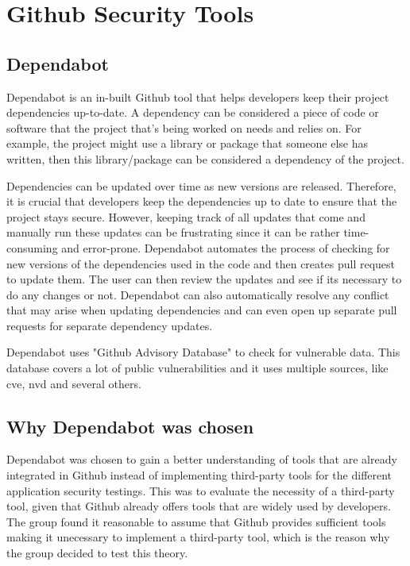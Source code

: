 \section{Github Security Tools}

\subsection{Dependabot}
Dependabot is an in-built Github tool that helps developers keep their project dependencies up-to-date. A dependency can be considered a piece of code or software that the project that's being worked on needs and relies on. For example, the project might use a library or package that someone else has written, then this library/package can be considered a dependency of the project. 

Dependencies can be updated over time as new versions are released. Therefore, it is crucial that developers keep the dependencies up to date to ensure that the project stays secure. However, keeping track of all updates that come and manually run these updates can be frustrating since it can be rather time-consuming and error-prone. Dependabot automates the process of checking for new versions of the dependencies used in the code and then creates pull request to update them. The user can then review the updates and see if its necessary to do any changes or not. 
Dependabot can also automatically resolve any conflict that may arise when updating dependencies and can even open up separate pull requests for separate dependency updates.  \cite{GithubDependabot2}

Dependabot uses "Github Advisory Database" to check for vulnerable data. This database covers a lot of public vulnerabilities and it uses multiple sources, like \acrlong{cve}, \acrlong{nvd} and several others. \cite{GithubDependabot1}

\subsection{Why Dependabot was chosen}
Dependabot was chosen to gain a better understanding of tools that are already integrated in Github instead of implementing third-party tools for the different application security testings. This was to evaluate the necessity of a third-party tool, given that Github already offers tools that are widely used by developers. The group found it reasonable to assume that Github provides sufficient tools making it unecessary to implement a third-party tool, which is the reason why the group decided to test this theory. 
